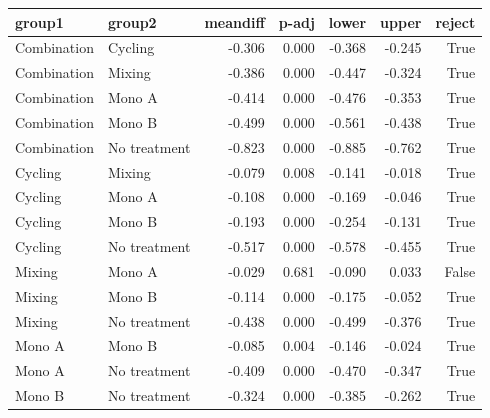 \begin{tabular}{llrrrrr}
\toprule
group1 & group2 & meandiff & p-adj & lower & upper & reject \\
\midrule
Combination & Cycling & -0.306 & 0.000 & -0.368 & -0.245 & True \\
Combination & Mixing & -0.386 & 0.000 & -0.447 & -0.324 & True \\
Combination & Mono A & -0.414 & 0.000 & -0.476 & -0.353 & True \\
Combination & Mono B & -0.499 & 0.000 & -0.561 & -0.438 & True \\
Combination & No treatment & -0.823 & 0.000 & -0.885 & -0.762 & True \\
Cycling & Mixing & -0.079 & 0.008 & -0.141 & -0.018 & True \\
Cycling & Mono A & -0.108 & 0.000 & -0.169 & -0.046 & True \\
Cycling & Mono B & -0.193 & 0.000 & -0.254 & -0.131 & True \\
Cycling & No treatment & -0.517 & 0.000 & -0.578 & -0.455 & True \\
Mixing & Mono A & -0.029 & 0.681 & -0.090 & 0.033 & False \\
Mixing & Mono B & -0.114 & 0.000 & -0.175 & -0.052 & True \\
Mixing & No treatment & -0.438 & 0.000 & -0.499 & -0.376 & True \\
Mono A & Mono B & -0.085 & 0.004 & -0.146 & -0.024 & True \\
Mono A & No treatment & -0.409 & 0.000 & -0.470 & -0.347 & True \\
Mono B & No treatment & -0.324 & 0.000 & -0.385 & -0.262 & True \\
\bottomrule
\end{tabular}
